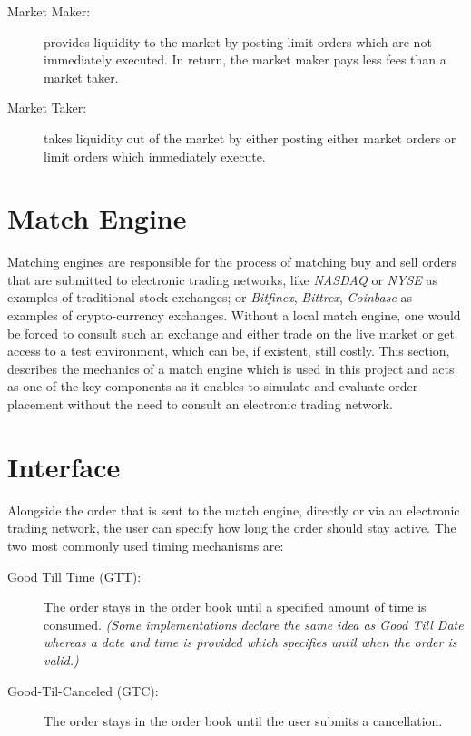 \begin{description}
    \item[Market Maker:] provides liquidity to the market by posting limit orders which are not immediately executed.
    In return, the market maker pays less fees than a market taker.
    
    \item[Market Taker:] takes liquidity out of the market by either posting either market orders or limit orders which immediately execute.
\end{description}



\section{Match Engine}
\label{sec:match-engine}

Matching engines are responsible for the process of matching buy and sell orders that are submitted to electronic trading networks, like \textit{NASDAQ} or \textit{NYSE} as examples of traditional stock exchanges; or \textit{Bitfinex}, \textit{Bittrex}, \textit{Coinbase} as examples of crypto-currency exchanges.
Without a local match engine, one would be forced to consult such an exchange and either trade on the live market or get access to a test environment, which can be, if existent, still costly.
This section, describes the mechanics of a match engine which is used in this project and acts as one of the key components as it enables to simulate and evaluate order placement without the need to consult an electronic trading network.

\section{Interface}

Alongside the order that is sent to the match engine, directly or via an electronic trading network, the user can specify how long the order should stay active.
The two most commonly used timing mechanisms are:
\begin{description}
    \item[Good Till Time (GTT): ] The order stays in the order book until a specified amount of time is consumed. \textit{(Some implementations declare the same idea as Good Till Date whereas a date and time is provided which specifies until when the order is valid.)}
    \item[Good-Til-Canceled (GTC): ] The order stays in the order book until the user submits a cancellation.
\end{description}


